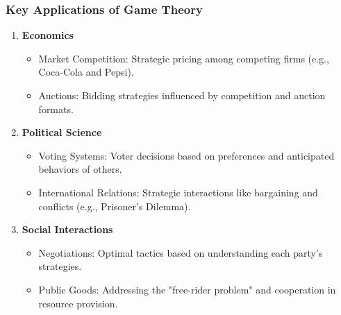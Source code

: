 \documentclass[aspectratio=169]{beamer}
\begin{document}
\begin{frame}[fragile]
    \frametitle{Key Applications of Game Theory}
    \begin{enumerate}
        \item \textbf{Economics}
        \begin{itemize}
            \item Market Competition: Strategic pricing among competing firms (e.g., Coca-Cola and Pepsi).
            \item Auctions: Bidding strategies influenced by competition and auction formats.
        \end{itemize}
        
        \item \textbf{Political Science}
        \begin{itemize}
            \item Voting Systems: Voter decisions based on preferences and anticipated behaviors of others.
            \item International Relations: Strategic interactions like bargaining and conflicts (e.g., Prisoner's Dilemma).
        \end{itemize}
        
        \item \textbf{Social Interactions}
        \begin{itemize}
            \item Negotiations: Optimal tactics based on understanding each party's strategies.
            \item Public Goods: Addressing the "free-rider problem" and cooperation in resource provision.
        \end{itemize}
    \end{enumerate}
\end{frame}
\end{document}
